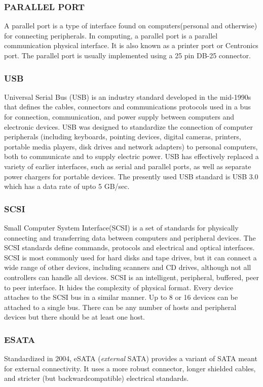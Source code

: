 \documentclass[a4paper,28pt,twoside,openright]{report}
\begin{document}
\subsubsection*{PARALLEL PORT}
	 A parallel port is a type of interface found on computers(personal and otherwise) for
	connecting peripherals. In computing, a parallel port is a parallel communication physical interface. It is
	also known as a printer port or Centronics port. The parallel port is usually implemented using a 25 pin DB-25 connector.
\subsubsection*{ USB}
	 Universal Serial Bus (USB) is an industry standard developed in the mid-1990s that defines the
	cables, connectors and communications protocols used in a bus for connection, communication, and power
	supply between computers and electronic devices. USB was designed to standardize the connection
	of computer peripherals (including keyboards, pointing devices, digital cameras, printers, portable media
	players, disk drives and network adapters) to personal computers, both to communicate and to
	supply electric power. USB has effectively replaced a variety of earlier interfaces, such as serial and parallel 		ports,
	as well as separate power chargers for portable devices. The presently used USB standard is USB 3.0 which
	has a data rate of upto 5 GB/sec.
\subsubsection*{ SCSI}
	 Small Computer System Interface(SCSI) is a set of standards for physically connecting and
	transferring data between computers and peripheral devices. The SCSI standards define commands,
	protocols and electrical and optical interfaces. SCSI is most commonly used for hard disks and tape drives,
	but it can connect a wide range of other devices, including scanners and CD drives, although not all
	controllers can handle all devices. SCSI is an intelligent, peripheral, buffered, peer to peer interface. It hides
	the complexity of physical format. Every device attaches to the SCSI bus in a similar manner. Up to 8 or 16
	devices can be attached to a single bus. There can be any number of hosts and peripheral devices but there
	should be at least one host.
\subsubsection*{ESATA}
	 Standardized in 2004, eSATA (\emph{external} SATA) provides a variant of SATA meant for
	external connectivity. It uses a more robust connector, longer shielded cables, and stricter (but backwardcompatible)
	electrical standards.
\end{document}
